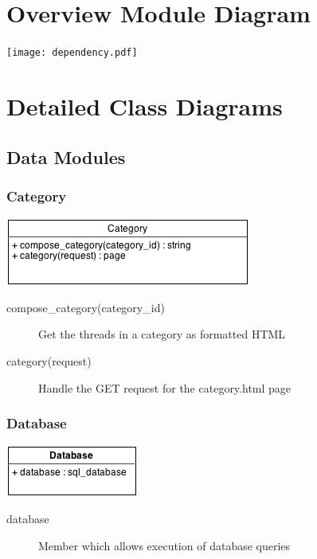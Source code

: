 \documentclass[12pt]{scrartcl}
\begin{document}


\newpage\null\thispagestyle{empty}\newpage

\tableofcontents

\newpage\null\thispagestyle{empty}\newpage

\section{Overview Module Diagram}
\texttt{[image: dependency.pdf]}

\section{Detailed Class Diagrams}
\subsection{Data Modules}
\subsubsection{Category}
\includegraphics[keepaspectratio]{umls/category_uml.png}
\begin{description}
\item [compose\_category(category\_id)] Get the threads in a category as formatted HTML
\item [category(request)] Handle the GET request for the category.html page
\end{description}

\subsubsection{Database}
\includegraphics[keepaspectratio]{umls/database_uml.png}
\begin{description}
\item [database] Member which allows execution of database queries 
\end{description}
\end{document}
